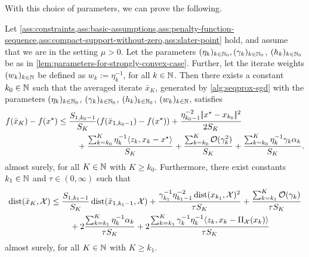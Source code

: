 With this choice of parameters, we can prove the following.
\begin{theorem}
    \label{thm:upper-bound-on-f(xk)-f(xstar)-and-dist(xk)}
    Let \cref{ass:constraints,ass:basic-assumptions,ass:penalty-function-sequence,ass:compact-support-without-zero,ass:slater-point}
    hold, and assume that we are in the setting $\mu > 0$.
    Let the parameters $(\eta_k)_{k\in\mathbb{N}_0}, (\gamma_k)_{k\in\mathbb{N}_0}$, $(h_k)_{k\in\mathbb{N}_0}$
    be as in \cref{lem:parameters-for-strongly-convex-case}.
    Further, let the iterate weights $(w_k)_{k\in\mathbb{N}}$
    be defined as $w_k := \eta_k^{-1}$, for all $k\in\mathbb{N}$.
    Then there exists a constant $k_0\in\mathbb{N}$
    such that the averaged iterate $\bar{x}_K$,
    generated by \cref{alg:seqprox-sgd}
    with the parameters $(\eta_k)_{k\in\mathbb{N}_0}$, $(\gamma_k)_{k\in\mathbb{N}_0}$, $(h_k)_{k\in\mathbb{N}_0}$, $(w_k)_{k\in\mathbb{N}}$,
    satisfies
    \begin{align*}
        f(\bar{x}_K) - f(x^\star)
        &\leq
        \frac{S_{1, k_0-1}}{S_K} (f(\bar{x}_{1, k_0-1}) - f(x^\star))
        +
        \frac{\eta_{k_0-1}^{-2} |\!|x^\star - x_{k_0}|\!|^2}{2S_K} \\
        &\phantom{===} + \frac{\sum_{k=k_0}^K \eta_k^{-1}\langle z_k, x_k - x^\star \rangle}{S_K} + \frac{\sum_{k=k_0}^{K} \mathcal{O}(\gamma_k^2)}{S_K}
            + \frac{\sum_{k=k_0}^{K}\eta_k^{-1}\gamma_k\alpha_k}{S_K}.
    \end{align*}
    almost surely,
    for all $K\in\mathbb{N}$ with $K \geq k_0$.
    Furthermore, there exist constants $k_1\in\mathbb{N}$ and $\tau \in (0, \infty)$ such that
    \begin{align*}
        \operatorname{dist}(\bar{x}_K, \mathcal{X})
        &\leq
        \frac{S_{1, k_1-1}}{S_K} \operatorname{dist}(\bar{x}_{1, k_1-1}, \mathcal{X})
            + \frac{\gamma_{k_1}^{-1} \eta_{k_1-1}^{-2} \operatorname{dist}(x_{k_1}, \mathcal{X})^2}{\tau S_K}
            + \frac{\sum_{k=k_1}^{K} \mathcal{O}(\gamma_k)}{\tau S_K} \\
        &\phantom{===} + 2 \frac{\sum_{k=k_1}^{K}\eta_k^{-1}\alpha_k}{\tau S_K}
            + 2\frac{\sum_{k=k_1}^K \gamma_k^{-1}\eta_k^{-1} \langle z_k, x_k - \operatorname{\Pi_\mathcal{X}}(x_k) \rangle}{\tau S_K}
    \end{align*} 
    almost surely, for all $K\in\mathbb{N}$ with $K \geq k_1$.
\end{theorem}

